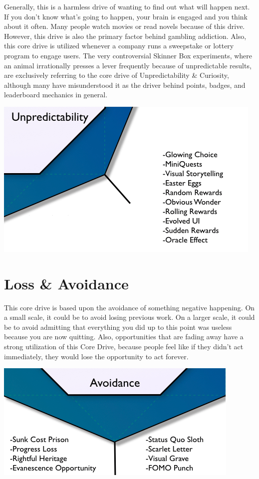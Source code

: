 \documentclass[
]{book}
\begin{document}
Generally, this is a harmless drive of wanting to find out what will happen next. If you don't know what's going to happen, your brain is engaged and you think about it often. Many people watch movies or read novels because of this drive. However, this drive is also the primary factor behind gambling addiction. Also, this core drive is utilized whenever a company runs a sweepstake or lottery program to engage users. The very controversial Skinner Box experiments, where an animal irrationally presses a lever frequently because of unpredictable results, are exclusively referring to the core drive of Unpredictability \& Curiosity, although many have misunderstood it as the driver behind points, badges, and leaderboard mechanics in general.

\begin{center}\includegraphics[width=0.75\linewidth]{assets/images/core-drive-7-unpredictability-and-curiosity} \end{center}

\hypertarget{loss-avoidance}{%
\section{Loss \& Avoidance}\label{loss-avoidance}}

This core drive is based upon the avoidance of something negative happening. On a small scale, it could be to avoid losing previous work. On a larger scale, it could be to avoid admitting that everything you did up to this point was useless because you are now quitting. Also, opportunities that are fading away have a strong utilization of this Core Drive, because people feel like if they didn't act immediately, they would lose the opportunity to act forever.

\begin{center}\includegraphics[width=0.75\linewidth]{assets/images/core-drive-8-loss-and-avoidance} \end{center}
\end{document}

